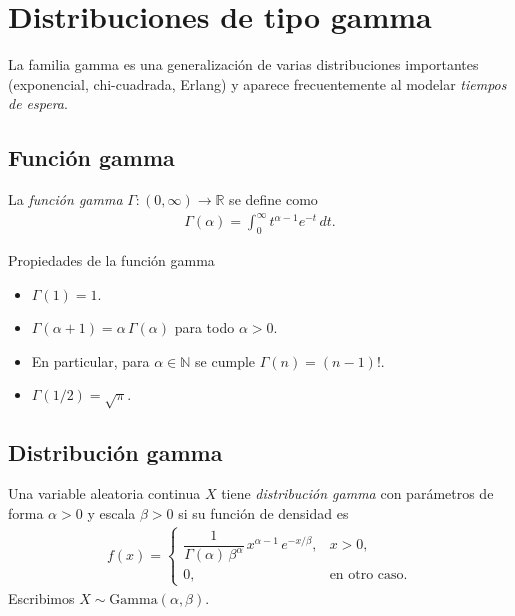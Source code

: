 \section{Distribuciones de tipo gamma}

La familia gamma es una generalización de varias distribuciones importantes
(exponencial, chi-cuadrada, Erlang) y aparece frecuentemente al modelar
\emph{tiempos de espera}.

\subsection{Función gamma}

\begin{definicion}
La \emph{función gamma} $\Gamma: (0,\infty) \to \mathbb{R}$ se define como
\begin{align}
 \label{eq:2.8.6}
 \Gamma(\alpha) = \int_0^\infty t^{\alpha-1} e^{-t}\,dt.
\end{align}
\end{definicion}

{Propiedades de la función gamma}
\begin{itemize}
 \item $\Gamma(1) = 1$.
 \item $\Gamma(\alpha + 1) = \alpha\,\Gamma(\alpha)$ para todo $\alpha > 0$.
 \item En particular, para $\alpha \in \mathbb{N}$ se cumple
 $\Gamma(n) = (n-1)!$.
 \item $\Gamma(1/2) = \sqrt{\pi}$.
\end{itemize}

\subsection{Distribución gamma}

\begin{definicion}
Una variable aleatoria continua $X$ tiene \emph{distribución gamma} con parámetros
de forma $\alpha > 0$ y escala $\beta > 0$ si su función de densidad es
\begin{align}
 \label{eq:2.8.7}
 f(x) =
 \begin{cases}
  \dfrac{1}{\Gamma(\alpha)\,\beta^\alpha}\,x^{\alpha-1}\,e^{-x/\beta},
  & x > 0, \\
  0, & \text{en otro caso.}
 \end{cases}
\end{align}
Escribimos $X \sim \text{Gamma}(\alpha, \beta)$.
\end{definicion}

